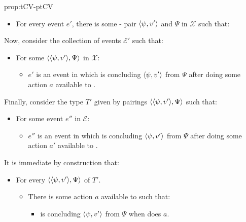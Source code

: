 \begin{note}
\begin{argument}{prop:tCV-ptCV}
    \begin{itemize}[noitemsep]
    \item
      For every event \(e'\), there is some -\val{} pair \(\langle \psi, v' \rangle\) and  \(\Psi\) in \(\mathcal{X}\) such that:
    \end{itemize}

    \noindent%
    Now, consider the collection of events \(\mathcal{E}'\) such that:
    \begin{itemize}[noitemsep]
    \item
      For some \(\langle \langle \psi, v' \rangle, \Psi \rangle\) in \(\mathcal{X}\):
      \begin{itemize}[noitemsep]
      \item
        \(e'\) is an event in which \vAgent{} is concluding \(\langle \psi, v' \rangle\) from \(\Psi\) after doing some action \(a\) available to \vAgent{}.
      \end{itemize}
    \end{itemize}

    \noindent%
    Finally, consider the type \(T'\) given by pairings \(\langle \langle \psi, v' \rangle, \Psi \rangle\) such that:
    \begin{itemize}[noitemsep]
    \item
      For some event \(e''\) in \(\mathcal{E}\):
      \begin{itemize}[noitemsep]
      \item
        \(e''\) is an event in which \vAgent{} is concluding \(\langle \psi, v' \rangle\) from \(\Psi\) after doing some action \(a'\) available to \vAgent{}.
      \end{itemize}
    \end{itemize}

    \noindent%
    It is immediate by construction that:
    \begin{itemize}[noitemsep]
    \item
      For every \tI{} \(\langle \langle \psi, v' \rangle, \Psi \rangle\) of \(T'\).
      \begin{itemize}[noitemsep]
      \item
        There is some action \(a\) available to \vAgent{} such that:
        \begin{itemize}
        \item
          \vAgent{} is concluding \(\langle \psi, v' \rangle\) from \(\Psi\) when \vAgent{} does \(a\).
        \end{itemize}
      \end{itemize}
    \end{itemize}
    \vspace{-1.5\baselineskip}
  \end{argument}
\end{note}

